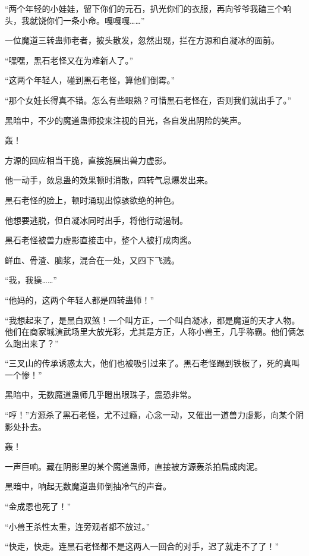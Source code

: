 
\begin{this_body}



“两个年轻的小娃娃，留下你们的元石，扒光你们的衣服，再向爷爷我磕三个响头，我就饶你们一条小命。嘎嘎嘎……”

一位魔道三转蛊师老者，披头散发，忽然出现，拦在方源和白凝冰的面前。

“嘿嘿，黑石老怪又在为难新人了。”

“这两个年轻人，碰到黑石老怪，算他们倒霉。”

“那个女娃长得真不错。怎么有些眼熟？可惜黑石老怪在，否则我们就出手了。”

黑暗中，不少的魔道蛊师投来注视的目光，各自发出阴险的笑声。

轰！

方源的回应相当干脆，直接施展出兽力虚影。

他一动手，敛息蛊的效果顿时消散，四转气息爆发出来。

黑石老怪的脸上，顿时涌现出惊骇欲绝的神色。

他想要逃脱，但白凝冰同时出手，将他行动遏制。

黑石老怪被兽力虚影直接击中，整个人被打成肉酱。

鲜血、骨渣、脑浆，混合在一处，又四下飞溅。

“我，我操……”

“他妈的，这两个年轻人都是四转蛊师！”

“我想起来了，是黑白双煞！一个叫方正，一个叫白凝冰，都是魔道的天才人物。他们在商家城演武场里大放光彩，尤其是方正，人称小兽王，几乎称霸。他们俩怎么跑出来了？”

“三叉山的传承诱惑太大，他们也被吸引过来了。黑石老怪踢到铁板了，死的真叫一个惨！”

黑暗中，无数魔道蛊师几乎瞪出眼珠子，震恐非常。

“哼！”方源杀了黑石老怪，尤不过瘾，心念一动，又催出一道兽力虚影，向某个阴影处扑去。

轰！

一声巨响。藏在阴影里的某个魔道蛊师，直接被方源轰杀拍扁成肉泥。

黑暗中，响起无数魔道蛊师倒抽冷气的声音。

“金成恩也死了！”

“小兽王杀性太重，连旁观者都不放过。”

“快走，快走。连黑石老怪都不是这两人一回合的对手，迟了就走不了了！”


\end{this_body}
